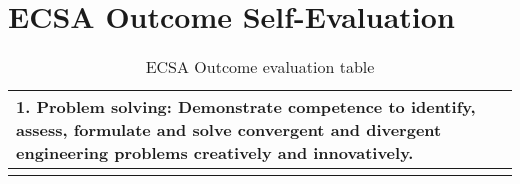 \chapter{ECSA Outcome Self-Evaluation}

\begin{table}
\footnotesize
\centering
\caption{ECSA Outcome evaluation table}
\begin{tabular}{|p{6.75cm}|p{6.75cm}|}

  \hline
  \textbf{1. Problem solving:} Demonstrate competence to identify, assess, formulate and
  solve convergent and divergent engineering problems creatively and innovatively. &  \\\hline
  \textbf{}
  
  
\end{tabular}
\end{table}
